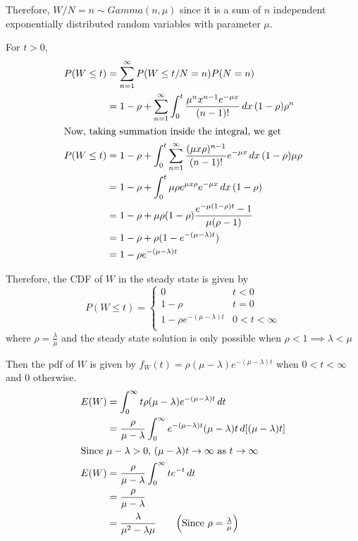 \documentclass[12pt, oneside]{article}
\begin{document}
\begin{enumerate}
{    Therefore, \(W / N = n \sim Gamma(n, \mu)\)  since it is a sum of \(n\) independent
    exponentially distributed random variables with parameter \(\mu\).

    For \(t > 0\),
    \begin{align*}
        P(W \leq t) &= \sum_{n=1}^{\infty} P(W \leq t / N = n) P(N = n) \\
                    &= 1 - \rho + \sum_{n=1}^{\infty} \int_0^{t} \frac{\mu^n x^{n-1}e^{-\mu x}}{(n - 1)!}\,dx\,
                        (1 - \rho) \rho^n \\
        \intertext{Now, taking summation inside the integral, we get}
        P(W \leq t) &= 1 - \rho + \int_0^t \sum_{n=1}^{\infty} \frac{(\mu x \rho)^{n-1}}{(n - 1)!} e^{-\mu x}\,dx\,(1-\rho)\mu\rho \\
                    &= 1 - \rho + \int_0^t \mu \rho e^{\mu x \rho} e^{-\mu x} \,dx\, (1 -\rho) \\
                    &= 1 - \rho + \mu \rho (1 - \rho) \frac{e^{-\mu(1-\rho)t} - 1}{\mu(\rho - 1)} \\
                    &= 1 - \rho + \rho (1 - e^{-(\mu - \lambda)t}) \\
                    &= 1 - \rho e^{-(\mu - \lambda)t}
    \end{align*}

    Therefore, the CDF of \(W\) in the steady state is given by
    \[
        P(W \leq t) = \begin{cases}
                        0 & t < 0 \\
                        1 - \rho & t = 0 \\
                        1 - \rho e^{-(\mu - \lambda)t} & 0 < t < \infty \\
                      \end{cases}
    \]
    where \(\rho = \frac{\lambda}{\mu}\) and the steady state solution is only possible
    when \(\rho < 1 \implies \lambda < \mu\)

    Then the pdf of \(W\) is given by \(f_W(t) = \rho(\mu - \lambda)e^{-(\mu - \lambda)t}\) when
    \(0 < t < \infty\) and 0 otherwise.
    \begin{align*}
        E(W) &= \int_0^\infty t \rho(\mu - \lambda)e^{-(\mu - \lambda)t} \,dt \\
             &= \frac{\rho}{\mu - \lambda} \int_0^\infty e^{-(\mu - \lambda)t} (\mu - \lambda) t \,d[(\mu - \lambda)t] \\
        \intertext{Since \(\mu - \lambda > 0\), \((\mu - \lambda)t \to \infty\) as \(t \to \infty\)}
        E(W) &= \frac{\rho}{\mu - \lambda} \int_0^\infty te^{-t}\,dt \\
             &= \frac{\rho}{\mu - \lambda} \\
             &= \frac{\lambda}{\mu^2 - \lambda\mu} \tag*{\(\left(\text{Since } \rho = \frac{\lambda}{\mu}\right)\)}
    \end{align*}

}
\end{enumerate}
\end{document}
